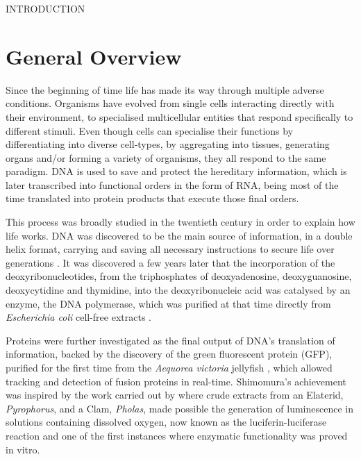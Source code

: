 INTRODUCTION

\chapter{General Overview}

Since the beginning of time life has made its way through multiple adverse conditions. Organisms have evolved from single cells interacting directly with their environment, to specialised multicellular entities that respond specifically to different stimuli. Even though cells can specialise their functions by differentiating into diverse cell-types, by aggregating into tissues, generating organs and/or forming a variety of organisms, they all respond to the same paradigm. DNA is used to save and protect the hereditary information, which is later transcribed into functional orders in the form of RNA, being most of the time translated into protein products that execute those final orders.

This process was broadly studied in the twentieth century in order to explain how life works. DNA was discovered to be the main source of information, in a double helix format, carrying and saving all necessary instructions to secure life over generations \citep{watson1953molecular}. It was discovered a few years later that the incorporation of the deoxyribonucleotides, from the triphosphates of deoxyadenosine, deoxyguanosine, deoxycytidine and thymidine, into the deoxyribonucleic acid was catalysed by an enzyme, the DNA polymerase, which was purified at that time directly from \textit{Escherichia coli} cell-free extracts \citep{lehman1958enzymatic}. 

Proteins were further investigated as the final output of DNA's translation of information, backed by the discovery of the green fluorescent protein (GFP), purified for the first time from the \textit{Aequorea victoria} jellyfish \citep{shimomura1962extraction}, which allowed tracking and detection of fusion proteins in real-time. Shimomura's achievement was inspired by the work carried out by \citet{dubois1885fonction} where crude extracts from an Elaterid, \textit{Pyrophorus}, and a Clam, \textit{Pholas}, made possible the generation of luminescence in solutions containing dissolved oxygen, now known as the luciferin-luciferase reaction and one of the first instances where enzymatic functionality was proved in vitro. 

